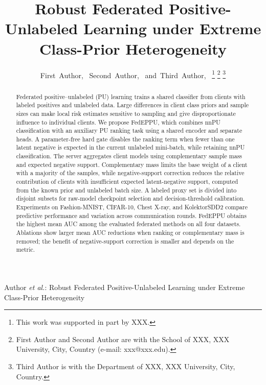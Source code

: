 \documentclass[lettersize,journal]{IEEEtran}
\begin{document}
\title{Robust Federated Positive-Unlabeled Learning under Extreme Class-Prior Heterogeneity}

\author{First~Author,~
        Second~Author,~
        and~Third~Author,~%
\thanks{This work was supported in part by XXX.}%
\thanks{First Author and Second Author are with the School of XXX, XXX University, City, Country (e-mail: xxx@xxx.edu).}%
\thanks{Third Author is with the Department of XXX, XXX University, City, Country.}}

%
{Author \MakeLowercase{\textit{et al.}}: Robust Federated Positive-Unlabeled Learning under Extreme Class-Prior Heterogeneity}

\maketitle

\begin{abstract}
Federated positive--unlabeled (PU) learning trains a shared classifier from clients with labeled positives and unlabeled data. Large differences in client class priors and sample sizes can make local risk estimates sensitive to sampling and give disproportionate influence to individual clients. We propose FedEPPU, which combines nnPU classification with an auxiliary PU ranking task using a shared encoder and separate heads. A parameter-free hard gate disables the ranking term when fewer than one latent negative is expected in the current unlabeled mini-batch, while retaining nnPU classification. The server aggregates client models using complementary sample mass and expected negative support. Complementary mass limits the base weight of a client with a majority of the samples, while negative-support correction reduces the relative contribution of clients with insufficient expected latent-negative support, computed from the known prior and unlabeled batch size. A labeled proxy set is divided into disjoint subsets for raw-model checkpoint selection and decision-threshold calibration. Experiments on Fashion-MNIST, CIFAR-10, Chest X-ray, and KolektorSDD2 compare predictive performance and variation across communication rounds. FedEPPU obtains the highest mean AUC among the evaluated federated methods on all four datasets. Ablations show larger mean AUC reductions when ranking or complementary mass is removed; the benefit of negative-support correction is smaller and depends on the metric.
\end{abstract}
\end{document}
